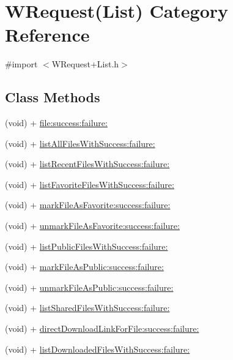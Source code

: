 \hypertarget{category_w_request_07_list_08}{\section{W\-Request(List) Category Reference}
\label{category_w_request_07_list_08}
}


{\ttfamily \#import $<$W\-Request+\-List.\-h$>$}

\subsection*{Class Methods}
\begin{DoxyCompactItemize}
\item 
(void) + \hyperlink{category_w_request_07_list_08_abf7ddcdde072e3541a959734263216e1}{file\-:success\-:failure\-:}
\item 
(void) + \hyperlink{category_w_request_07_list_08_a29ccd44a4227f89aaa66964a7dc50fd0}{list\-All\-Files\-With\-Success\-:failure\-:}
\item 
(void) + \hyperlink{category_w_request_07_list_08_a0cec426a8bb229f07a6693095c423cf3}{list\-Recent\-Files\-With\-Success\-:failure\-:}
\item 
(void) + \hyperlink{category_w_request_07_list_08_a8d48f16b2bd30e95c65add873ac983f9}{list\-Favorite\-Files\-With\-Success\-:failure\-:}
\item 
(void) + \hyperlink{category_w_request_07_list_08_ada3c70d1e92a68a83ea3630c8f7c9964}{mark\-File\-As\-Favorite\-:success\-:failure\-:}
\item 
(void) + \hyperlink{category_w_request_07_list_08_aeeb9485c55b338bcfa63c603d560ebd7}{unmark\-File\-As\-Favorite\-:success\-:failure\-:}
\item 
(void) + \hyperlink{category_w_request_07_list_08_a8e72edba383125d0f4817e5d898a9fe2}{list\-Public\-Files\-With\-Success\-:failure\-:}
\item 
(void) + \hyperlink{category_w_request_07_list_08_a8660b207462f7650c2bbc210f8e4e9fd}{mark\-File\-As\-Public\-:success\-:failure\-:}
\item 
(void) + \hyperlink{category_w_request_07_list_08_a527a040faf907ad890fe63ff4cdae4c9}{unmark\-File\-As\-Public\-:success\-:failure\-:}
\item 
(void) + \hyperlink{category_w_request_07_list_08_a0eb75c98cc56c3ad5798a16dc795e0fa}{list\-Shared\-Files\-With\-Success\-:failure\-:}
\item 
(void) + \hyperlink{category_w_request_07_list_08_aed14621e209bad705b2ebcd4de459593}{direct\-Download\-Link\-For\-File\-:success\-:failure\-:}
\item 
(void) + \hyperlink{category_w_request_07_list_08_afe6dff273a5604c139814f645485f3f9}{list\-Downloaded\-Files\-With\-Success\-:failure\-:}
\end{DoxyCompactItemize}


